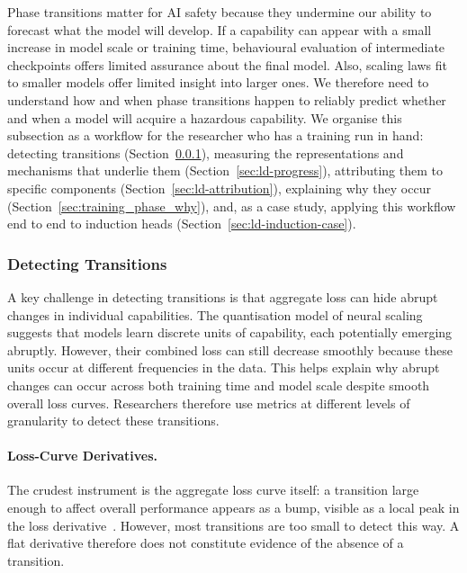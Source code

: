 Phase transitions matter for AI safety because they undermine our ability to forecast what the model will develop. If a capability can appear with a small increase in model scale or training time, behavioural evaluation of intermediate checkpoints offers limited assurance about the final model. Also, scaling laws fit to smaller models offer limited insight into larger ones. We therefore need to understand how and when phase transitions happen to reliably predict whether and when a model will acquire a hazardous capability. We organise this subsection as a workflow for the researcher who has a training run in hand: detecting transitions (Section~\ref{sec:ld-detect}), measuring the representations and mechanisms that underlie them (Section~\ref{sec:ld-progress}), attributing them to specific components (Section~\ref{sec:ld-attribution}), explaining why they occur (Section~\ref{sec:training_phase_why}), and, as a case study, applying this workflow end to end to induction heads (Section~\ref{sec:ld-induction-case}).

\subsubsection{Detecting Transitions}
\label{sec:ld-detect}

A key challenge in detecting transitions is that aggregate loss can hide abrupt changes in individual capabilities. The quantisation model of neural scaling~ suggests that models learn discrete units of capability, each potentially emerging abruptly. However, their combined loss can still decrease smoothly because these units occur at different frequencies in the data. This helps explain why abrupt changes can occur across both training time and model scale despite smooth overall loss curves. Researchers therefore use metrics at different levels of granularity to detect these transitions.

\paragraph{Loss-Curve Derivatives.} The crudest instrument is the aggregate loss curve itself: a transition large enough to affect overall performance appears as a bump, visible as a local peak in the loss derivative~. However, most transitions are too small to detect this way. A flat derivative therefore does not constitute evidence of the absence of a transition.

